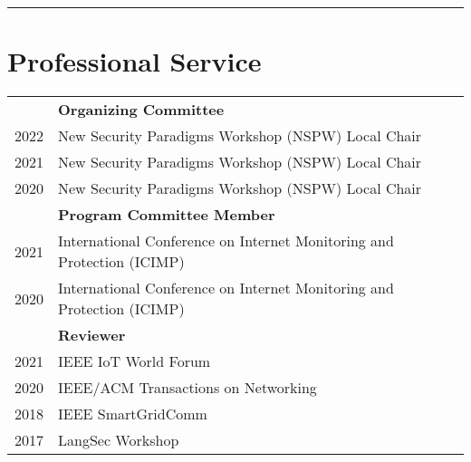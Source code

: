 \documentclass[letterpaper,10pt]{article}
\begin{document}



\hrule


\section*{\color{dartmouthgreen} Professional Service}

  \begin{tabular}{r l}
  & \textbf{Organizing Committee}\\
  2022 & New Security Paradigms Workshop (NSPW) Local Chair \\
  2021 & New Security Paradigms Workshop (NSPW) Local Chair \\
  2020 &New Security Paradigms Workshop (NSPW) Local Chair \\
  & \textbf{Program Committee Member} \\
  2021 & International Conference on Internet Monitoring and Protection (ICIMP) \\
  2020 & International Conference on Internet Monitoring and Protection (ICIMP) \\
  & \textbf{Reviewer} \\
  2021 & IEEE IoT World Forum \\
  2020 & IEEE/ACM Transactions on Networking \\
  2018 & IEEE SmartGridComm \\
  2017 & LangSec Workshop \\
  \end{tabular}
\end{document}
